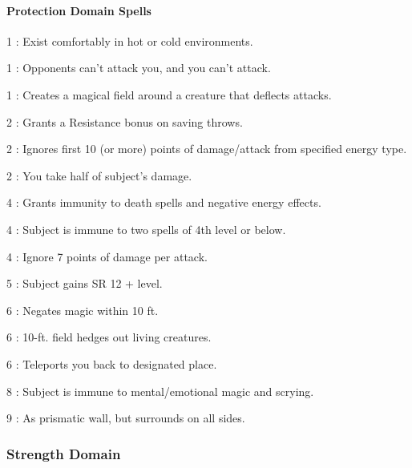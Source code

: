 \paragraph{Protection Domain Spells}
\begin{list}{}{\leftmargin=1em}
\item[1] : Exist comfortably in hot or cold environments.
\item[1] : Opponents can't attack you, and you can't attack.
\item[1] : Creates a magical field around a creature that deflects attacks.
\item[2] : Grants a Resistance bonus on saving throws.
\item[2] : Ignores first 10 (or more) points of damage/attack from specified energy type.
\item[2] : You take half of subject's damage.
\item[4] : Grants immunity to death spells and negative energy effects.
\item[4] : Subject is immune to two spells of 4th level or below.
\item[4] : Ignore 7 points of damage per attack.
\item[5] : Subject gains SR 12 + level.
\item[6] : Negates magic within 10 ft.
\item[6] : 10-ft. field hedges out living creatures.
\item[6] : Teleports you back to designated place.
\item[8] : Subject is immune to mental/emotional magic and scrying.
\item[9] : As prismatic wall, but surrounds on all sides.
\end{list}
\subsubsection{Strength Domain}
